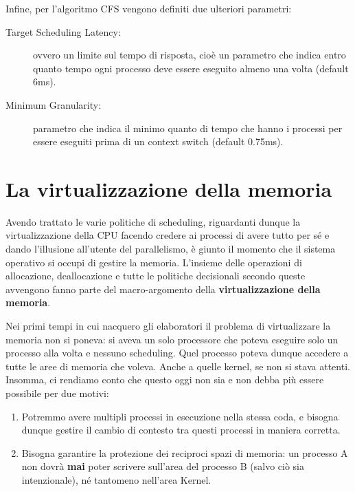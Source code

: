 \documentclass[12pt]{report}
\begin{document}
	Infine, per l'algoritmo CFS vengono definiti due ulteriori parametri:
	\begin{description}
		\item [Target Scheduling Latency:] ovvero un limite sul tempo di risposta, cioè un parametro che indica entro quanto tempo ogni processo deve essere eseguito almeno una volta (default 6ms).
		
		\item[Minimum Granularity:] parametro che indica il minimo quanto di tempo che hanno i processi per essere eseguiti prima di un context switch (default 0.75ms).
	\end{description}
	
	\chapter{La virtualizzazione della memoria}
	Avendo trattato le varie politiche di scheduling, riguardanti dunque la virtualizzazione della CPU facendo credere ai processi di avere tutto per sé e dando l'illusione all'utente del parallelismo, è giunto il momento che il sistema operativo si occupi di gestire la memoria. L'insieme delle operazioni di allocazione, deallocazione e tutte le politiche decisionali secondo queste avvengono fanno parte del macro-argomento della \textbf{virtualizzazione della memoria}.
	\smallbreak
	
	Nei primi tempi in cui nacquero gli elaboratori il problema di virtualizzare la memoria non si poneva: si aveva un solo processore che poteva eseguire solo un processo alla volta e nessuno scheduling. Quel processo poteva dunque accedere a tutte le aree di memoria che voleva. Anche a quelle kernel, se non si stava attenti.\\
	Insomma, ci rendiamo conto che questo oggi non sia e non debba  più essere possibile per due motivi:
	\begin{enumerate}
		\item Potremmo avere multipli processi in esecuzione nella stessa coda, e bisogna dunque gestire il cambio di contesto tra questi processi in maniera corretta.
		
		\item Bisogna garantire la protezione dei reciproci spazi di memoria: un processo A non dovrà \textbf{mai} poter scrivere sull'area del processo B (salvo ciò sia intenzionale), né tantomeno nell'area Kernel.
	\end{enumerate}
	
\end{document}
